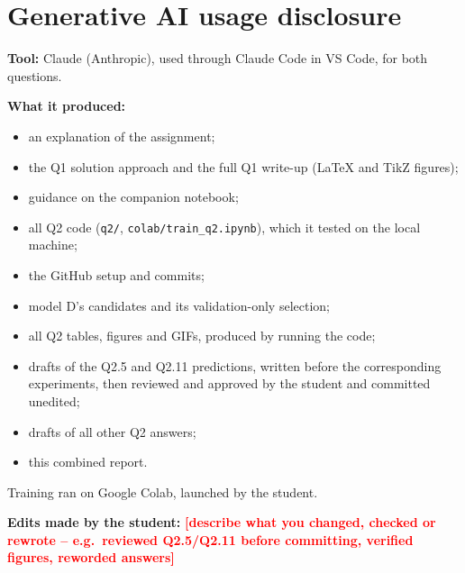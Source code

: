 \documentclass[11pt,a4paper]{article}
\begin{document}
\section*{Generative AI usage disclosure}
{\small
\textbf{Tool:} Claude (Anthropic), used through Claude Code in VS Code, for
both questions.

\textbf{What it produced:}
\begin{itemize}
  \item an explanation of the assignment;
  \item the Q1 solution approach and the full Q1 write-up (LaTeX and TikZ
        figures);
  \item guidance on the companion notebook;
  \item all Q2 code (\texttt{q2/}, \texttt{colab/train\_q2.ipynb}), which it
        tested on the local machine;
  \item the GitHub setup and commits;
  \item model D's candidates and its validation-only selection;
  \item all Q2 tables, figures and GIFs, produced by running the code;
  \item drafts of the Q2.5 and Q2.11 predictions, written before the
        corresponding experiments, then reviewed and approved by the student
        and committed unedited;
  \item drafts of all other Q2 answers;
  \item this combined report.
\end{itemize}
Training ran on Google Colab, launched by the student.

\textbf{Edits made by the student:}
\textcolor{red}{\textbf{[describe what you changed, checked or rewrote -- e.g.\ reviewed Q2.5/Q2.11 before committing, verified figures, reworded answers]}}

}
\end{document}
